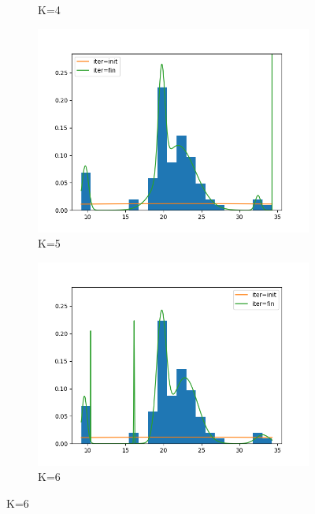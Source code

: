 \begin{figure}
\begin{subfigure}[b]{0.3\textwidth}
         \caption{K=4}
         \label{fig:Reg_loc_scale4}
     \end{subfigure}
     \hfill
     \hfill
     \begin{subfigure}[b]{0.3\textwidth}
         \centering
         \includegraphics[width=\textwidth]{../code/regular_loc_scale_plots/galaxies_hist_k_5.png}
         \caption{K=5}
         \label{fig:Reg_loc_scale5}
     \end{subfigure}
     \hfill
     \begin{subfigure}[b]{0.3\textwidth}
         \centering
         \includegraphics[width=\textwidth]{../code/regular_loc_scale_plots/galaxies_hist_k_6.png}
         \caption{K=6}
         \label{fig:Reg_loc_scale6}
     \end{subfigure}

\end{figure}
